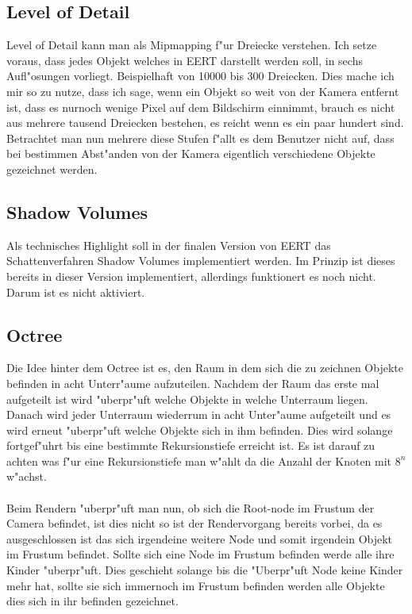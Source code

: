 \documentclass[a4paper,titlepage]{article}
\begin{document}
\subsection{Level of Detail}
Level of Detail kann man als Mipmapping f"ur Dreiecke verstehen. Ich setze voraus, dass jedes Objekt welches 
in EERT darstellt werden soll, in sechs Aufl"osungen vorliegt. Beispielhaft von 10000 bis 300 Dreiecken. Dies 
mache ich mir so zu nutze, dass ich sage, wenn ein Objekt so weit von der Kamera entfernt ist, dass es nurnoch 
wenige Pixel auf dem Bildschirm einnimmt, brauch es nicht aus mehrere tausend Dreiecken bestehen, es reicht 
wenn es ein paar hundert sind.
Betrachtet man nun mehrere diese Stufen f"allt es dem Benutzer nicht auf, dass bei bestimmen Abst"anden von 
der Kamera eigentlich verschiedene Objekte gezeichnet werden.

\subsection{Shadow Volumes}
Als technisches Highlight soll in der finalen Version von EERT das Schattenverfahren Shadow Volumes 
implementiert werden. Im Prinzip ist dieses bereits in dieser Version implementiert, allerdings funktionert
es noch nicht. Darum ist es nicht aktiviert.

\subsection{Octree}
Die Idee hinter dem Octree ist es, den Raum in dem sich die zu zeichnen Objekte befinden in acht Unterr"aume 
aufzuteilen. Nachdem der Raum das erste mal aufgeteilt ist wird "uberpr"uft welche Objekte in welche Unterraum 
liegen. Danach wird jeder Unterraum wiederrum in acht Unter"aume aufgeteilt und es wird erneut "uberpr"uft 
welche Objekte sich in ihm befinden. Dies wird solange fortgef"uhrt bis eine bestimmte Rekursionstiefe 
erreicht ist. Es ist darauf zu achten was f"ur eine Rekursionstiefe man w"ahlt da die Anzahl der Knoten mit 
$8^n$ w"achst.\\\\

Beim Rendern "uberpr"uft man nun, ob sich die Root-node im Frustum der Camera befindet, ist dies nicht so ist 
der Rendervorgang bereits vorbei, da es ausgeschlossen ist das sich irgendeine weitere Node und somit 
irgendein Objekt im Frustum befindet. Sollte sich eine Node im Frustum befinden werde alle ihre Kinder 
"uberpr"uft. Dies geschieht solange bis die "Uberpr"uft Node keine Kinder mehr hat, sollte sie sich immernoch 
im Frustum befinden werden alle Objekte dies sich in ihr befinden gezeichnet.\\\\
\end{document}
